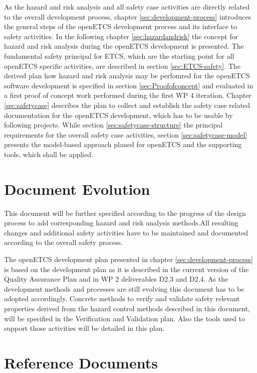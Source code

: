 \documentclass{template/openetcs_report}
\begin{document}
As the hazard and risk analysis and all safety case activities are directly related to the overall development process, chapter \ref{sec:development-process} introduces the general steps of the openETCS development process and its interface to safety activities. In the following chapter \ref{sec:hazardandrisk} the concept for hazard and risk analysis during the openETCS development is presented. The fundamental safety principal for ETCS, which are the starting point for all openETCS specific activities, are described in section \ref{sec:ETCS-safety}.
The derived plan how hazard and risk analysis may be perfomred for the openETCS software development is specified in section \ref{sec:Proofofconcept} and evaluated in a first proof of concept work performed during the first WP 4 iteration. Chapter \ref{sec:safetycase} describes the plan to collect and establish the safety case related documentation for the openETCS development, which has to be usable by following projects. While section \ref{sec:safetycase-structure} the principal requirements for the overall safety case activities, section \ref{sec:safetycase-model} presents the model-based approach planed for openETCS and the supporting tools, which shall be applied.

\section{Document Evolution}

This document will be further specified according to the progress of the design process to add corresponding hazard and risk analysis methods.All resulting changes and additional safety activities have to be maintained and documented according to the overall safety process. 

The openETCS development plan presented in chapter \ref{sec:development-process} is based on the development plan as it is described in the current version of the Quality Assurance Plan and in WP 2 deliverables D2.3 and D2.4. As the development methods and processes are still evolving this document has to be adopted accordingly. Concrete methods to verify and validate safety relevant properties derived from the hazard control methods described in this document, will be specified in the Verification and Validation plan. Also the tools used to support those activities will be detailed in this plan.

\section{Reference Documents}
\label{sec:refdoc}
\end{document}
